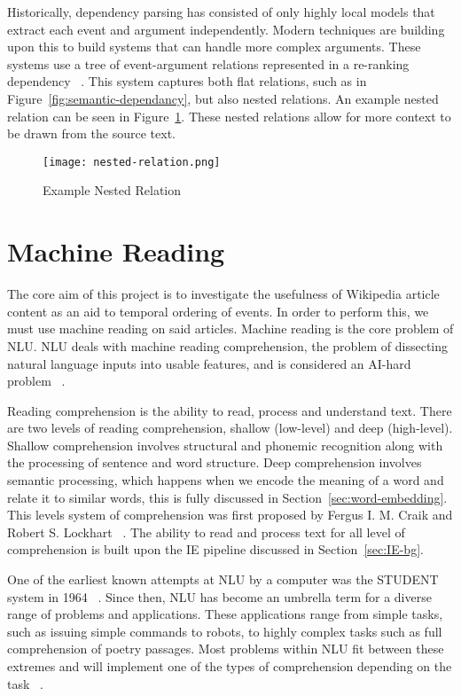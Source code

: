 \documentclass[bsc,frontabs,twoside,singlespacing,parskip,deptreport]{infthesis}     %
\begin{document}
Historically, dependency parsing has consisted of only highly local models that extract each event and argument independently.
Modern techniques are building upon this to build systems that can handle more complex arguments. These systems use a tree of
event-argument relations represented in a re-ranking dependency ~\cite{mcclosky2011event}.
This system captures both flat relations, such as in Figure~\ref{fig:semantic-dependancy}, but also nested relations.
An example nested relation can be seen in Figure~\ref{fig:nested-relation}. These nested relations allow for more context to be drawn from
the source text.


\begin{figure}[H]
  \centering
  \texttt{[image: nested-relation.png]}
  \caption{Example Nested Relation}
  \label{fig:nested-relation}
\end{figure}


\section{Machine Reading}
The core aim of this project is to investigate the usefulness of Wikipedia article content as an aid to temporal ordering of events.
In order to perform this, we must use machine reading on said articles.
Machine reading is the core problem of NLU.
NLU deals with machine reading comprehension, the problem of dissecting natural language inputs into usable features,
and is considered an AI-hard problem ~\cite{}.

Reading comprehension is the ability to read, process and understand text.  
There are two levels of reading comprehension, shallow (low-level) and deep (high-level).
Shallow comprehension involves structural and phonemic recognition along with the processing of sentence and  word
structure.
Deep comprehension involves semantic processing, which happens when we encode the meaning of a word and relate it
to similar words, this is fully discussed in Section~\ref{sec:word-embedding}.
This levels system of comprehension was first proposed by  Fergus I. M. Craik and Robert S. Lockhart ~\cite{wagner2009beyond}.
The ability to read and process text for all level of comprehension is built upon the IE pipeline discussed in Section~\ref{sec:IE-bg}.

One of the earliest known attempts at NLU by a computer was the STUDENT system in 1964 ~\cite{russell1995modern}.
Since then, NLU has become an
umbrella term for a diverse range of problems and applications. These applications range from simple tasks, such as
issuing simple commands to robots, to highly complex tasks such as full comprehension of poetry passages.
Most problems within NLU fit between these extremes and will implement one of the types of comprehension
depending on the task ~\cite{}.
\end{document}
